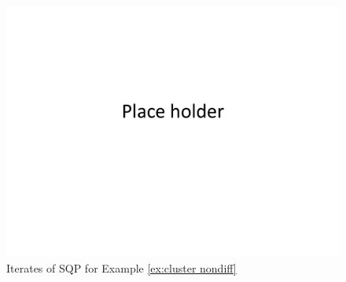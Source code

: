 \begin{exmp}
	\label{ex:cluster nondiff}
\begin{figure}[t]
\centering
\includegraphics[scale=0.3]{figures/placeHolder}
\caption{Iterates of SQP for Example \ref{ex:cluster nondiff}}
\label{fig:placeholder}
\end{figure}

\end{exmp}
